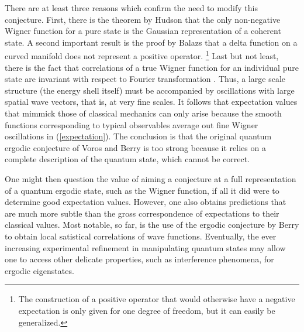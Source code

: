 \documentclass[12pt]{iopart}
\begin{document}
There are at least three reasons which confirm the need to modify this conjecture.
First, there is the theorem by Hudson \cite{Hudson} that the only non-negative Wigner function for a pure state
is the Gaussian representation of  a coherent state. A second important result is the proof by Balazs \cite{Balazs}
that a delta function on a curved manifold does not represent a positive operator.
\footnote{The construction of a positive operator that would otherwise have a negative expectation
is only given for one degree of freedom, but it can easily be generalized.}
Last but not least, there is the fact that correlations 
of a true Wigner function for an individual pure state are invariant 
with respect to Fourier transformation \cite{Chountasis, OVS}. 
Thus, a large scale structure (the energy shell itself) must be accompanied 
by oscillations with large spatial wave vectors,
that is, at very fine scales. It follows that
expectation values that mimmick those of classical mechanics
can only arise because the smooth functions corresponding to typical observables
average out fine Wigner oscillations in (\ref{expectation}).
The conclusion is that the original quantum ergodic conjecture of Voros and Berry 
is too strong because it relies on a complete description of the quantum state,
which cannot be correct.

One might then question the value of aiming a conjecture at a full representation
of a quantum ergodic state, such as the Wigner function, 
if all it did were to determine good expectation values. 
However, one also obtains predictions that are much more subtle than the gross
correspondence of expectations to their classical values. Most notable, so far, is the use 
of the ergodic conjecture by Berry to obtain local satistical correlations of wave functions.
Eventually, the ever increasing experimental refinement in manipulating quantum states
may allow one to access other delicate properties, such as interference phenomena,
for ergodic eigenstates.
\end{document}
